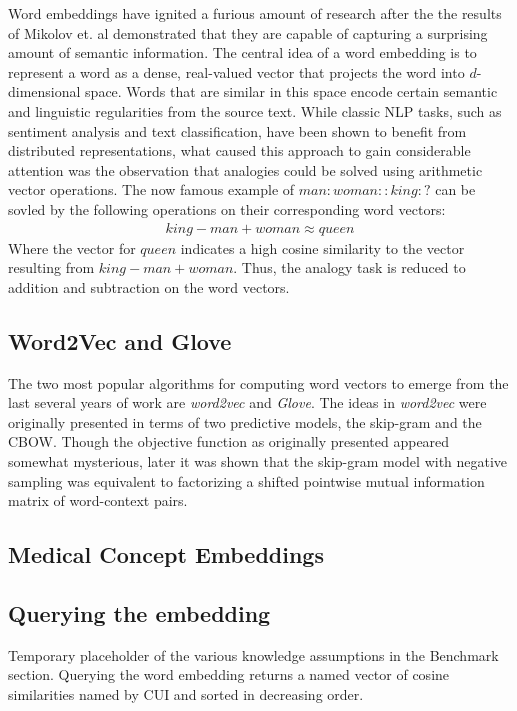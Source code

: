 \documentclass{ws-procs11x85}
\begin{document}
Word embeddings have ignited a furious amount of research after the the results of Mikolov\cite{mikolov2013distributed} et. al demonstrated that they are capable of capturing a surprising amount of semantic information. The central idea of a word embedding is to represent a word as a dense, real-valued vector that projects the word into $d$-dimensional space. Words that are similar in this space encode certain semantic and linguistic regularities from the source text. While classic NLP tasks, such as sentiment analysis and text classification, have been shown to benefit from distributed representations, what caused this approach to gain considerable attention was the observation that analogies could be solved using arithmetic vector operations. The now famous example of $man:woman::king:?$ can be sovled by the following operations on their corresponding word vectors: 
\begin{align*}
king - man + woman \approx queen
\end{align*}
Where the vector for $queen$ indicates a high cosine similarity to the vector resulting from $king - man + woman$. Thus, the analogy task is reduced to addition and subtraction on the word vectors.

 \subsection{Word2Vec and Glove}
The two most popular algorithms for computing word vectors to emerge from the last several years of work are \emph{word2vec}\cite{mikolov2013distributed} and \emph{Glove}\cite{pennington2014glove}. The ideas in \emph{word2vec} were originally presented in terms of two predictive models, the skip-gram and the CBOW. Though the objective function as originally presented appeared somewhat mysterious, later it was shown that the skip-gram model with negative sampling was equivalent to factorizing a shifted pointwise mutual information matrix\cite{levy2014neural} of word-context pairs.

 \subsection{Medical Concept Embeddings}


\subsection{Querying the embedding}
Temporary placeholder of the various knowledge assumptions in the Benchmark section. Querying the word embedding returns a named vector of cosine similarities named by CUI and sorted in decreasing order. 
\end{document}
